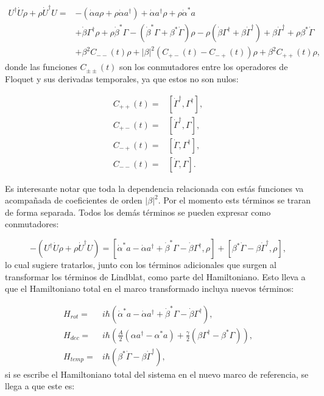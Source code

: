\documentclass[a4paper,10pt]{report}
\begin{document}
\begin{align*}
U^{\dagger}\dot{U}\rho + \rho \dot{U}^\dagger U =& -(\dot{\alpha}a \rho + \rho\dot{\alpha}a^{\dagger}) + \dot{\alpha}a^{\dagger}\rho + \rho \dot{\alpha}^*a\\
&+ \dot{\beta}\Gamma^{\dagger}\rho + \rho\dot{\beta}^*\Gamma-(\dot{\beta}^*\Gamma + \beta^*\dot{\Gamma})\rho - \rho(\dot{\beta} \Gamma^{\dagger} + \beta \dot{\Gamma}^{\dagger}) +\beta \dot{\Gamma}^{\dagger} + \rho\beta^* \dot{\Gamma}\\\
&+\beta^2C_{--}(t)\rho + |\beta|^2(C_{+-}(t) - C_{-+}(t))\rho +  \beta^2 C_{++}(t)\rho,
\end{align*} donde las funciones $C_{\pm \pm}(t)$ son los conmutadores entre los operadores de Floquet y sus derivadas temporales, ya que estos no son nulos:

\begin{align*}
C_{++}(t) =& [\dot{\Gamma}^{\dagger}, \Gamma^{\dagger}],\\
C_{+-}(t) =& [\dot{\Gamma}^{\dagger}, \Gamma],\\
C_{-+}(t) =& [\dot{\Gamma}, \Gamma^{\dagger}],\\
C_{--}(t) =& [\dot{\Gamma}, \Gamma].
\end{align*} 
 
Es interesante notar que toda la dependencia relacionada con estás funciones va acompañada de coeficientes de orden $|\beta|^2$. Por el momento ests términos se traran de forma separada. Todos los demás términos se pueden expresar como conmutadores:

\begin{equation}
-(U^{\dagger}\dot{U}\rho + \rho \dot{U}^\dagger U) = [\dot{\alpha}^*a-\dot{\alpha}a^\dagger+\dot{\beta}^*\Gamma-\dot{\beta}\Gamma^\dagger,\rho]+ [\beta^*\dot{\Gamma} - \beta \dot{\Gamma}^\dagger,\rho],
\end{equation} lo cual sugiere tratarlos, junto con los términos adicionales que surgen al transformar los términos de Lindblat, como parte del Hamiltoniano. Esto lleva a que el Hamiltoniano total en el marco transformado incluya nuevos términos:

\begin{align}
H_{rot} =& i\hbar(\dot{\alpha}^*a-\dot{\alpha}a^\dagger+\dot{\beta}^*\Gamma-\dot{\beta}\Gamma^\dagger),\\
H_{dec} =& i\hbar(\frac{A}{2}(\alpha a^\dagger - \alpha^*a)+\frac{\gamma}{2}(\beta\Gamma^{\dagger}-\beta^* \Gamma)),\\
H_{temp}=& i\hbar(\beta^*\dot{\Gamma} - \beta \dot{\Gamma}^\dagger),
\end{align} si se escribe el Hamiltoniano total del sistema en el nuevo marco de referencia, se llega a que este es:
\end{document}
